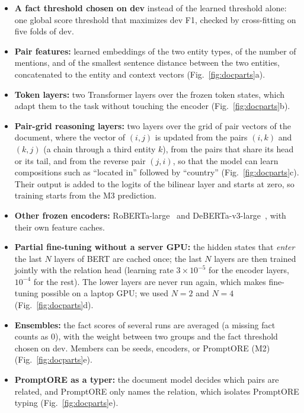 \documentclass[pdflatex,sn-mathphys-num]{sn-jnl}
\begin{document}
\begin{itemize}
\item \textbf{A fact threshold chosen on dev} instead of the learned threshold alone: one global score threshold that maximizes dev F1, checked by cross-fitting on five folds of dev.
\item \textbf{Pair features:} learned embeddings of the two entity types, of the number of mentions, and of the smallest sentence distance between the two entities, concatenated to the entity and context vectors (Fig.~\ref{fig:docparts}a).
\item \textbf{Token layers:} two Transformer layers over the frozen token states, which adapt them to the task without touching the encoder (Fig.~\ref{fig:docparts}b).
\item \textbf{Pair-grid reasoning layers:} two layers over the grid of pair vectors of the document, where the vector of $(i,j)$ is updated from the pairs $(i,k)$ and $(k,j)$ (a chain through a third entity $k$), from the pairs that share its head or its tail, and from the reverse pair $(j,i)$, so that the model can learn compositions such as ``located in'' followed by ``country'' (Fig.~\ref{fig:docparts}c). Their output is added to the logits of the bilinear layer and starts at zero, so training starts from the M3 prediction.
\item \textbf{Other frozen encoders:} RoBERTa-large~\cite{liu2019roberta} and DeBERTa-v3-large~\cite{he2023debertav3}, with their own feature caches.
\item \textbf{Partial fine-tuning without a server GPU:} the hidden states that \emph{enter} the last $N$ layers of BERT are cached once; the last $N$ layers are then trained jointly with the relation head (learning rate $3\times10^{-5}$ for the encoder layers, $10^{-4}$ for the rest). The lower layers are never run again, which makes fine-tuning possible on a laptop GPU; we used $N=2$ and $N=4$ (Fig.~\ref{fig:docparts}d).
\item \textbf{Ensembles:} the fact scores of several runs are averaged (a missing fact counts as 0), with the weight between two groups and the fact threshold chosen on dev. Members can be seeds, encoders, or PromptORE (M2) (Fig.~\ref{fig:docparts}e).
\item \textbf{PromptORE as a typer:} the document model decides which pairs are related, and PromptORE only names the relation, which isolates PromptORE typing (Fig.~\ref{fig:docparts}e).
\end{itemize}
\end{document}
